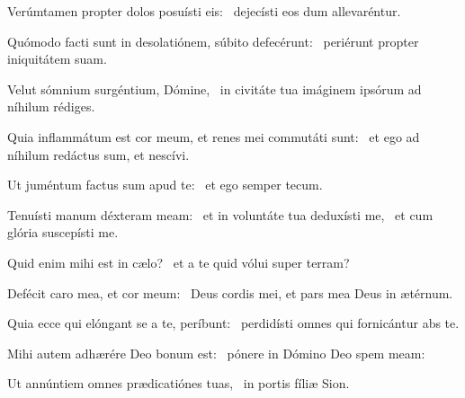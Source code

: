 \item Verúmtamen propter dolos posuísti eis:~\psstar{} dejecísti eos dum allevaréntur.

\item Quómodo facti sunt in desolatiónem, súbito defecérunt:~\psstar{} periérunt propter iniquitátem suam.

\item Velut sómnium surgéntium, Dómine,~\psstar{} in civitáte tua imáginem ipsórum ad níhilum rédiges.

\item Quia inflammátum est cor meum, et renes mei commutáti sunt:~\psstar{} et ego ad níhilum redáctus sum, et nescívi.

\item Ut juméntum factus sum apud te:~\psstar{} et ego semper tecum.

\item Tenuísti manum déxteram meam:~\pscross{} et in voluntáte tua deduxísti me,~\psstar{} et cum glória suscepísti me.

\item Quid enim mihi est in cælo?~\psstar{} et a te quid vólui super terram?

\item Defécit caro mea, et cor meum:~\psstar{} Deus cordis mei, et pars mea Deus in ætérnum.

\item Quia ecce qui elóngant se a te, períbunt:~\psstar{} perdidísti omnes qui fornicántur abs te.

\item Mihi autem adhærére Deo bonum est:~\psstar{} pónere in Dómino Deo spem meam:

\item Ut annúntiem omnes prædicatiónes tuas,~\psstar{} in portis fíliæ Sion.